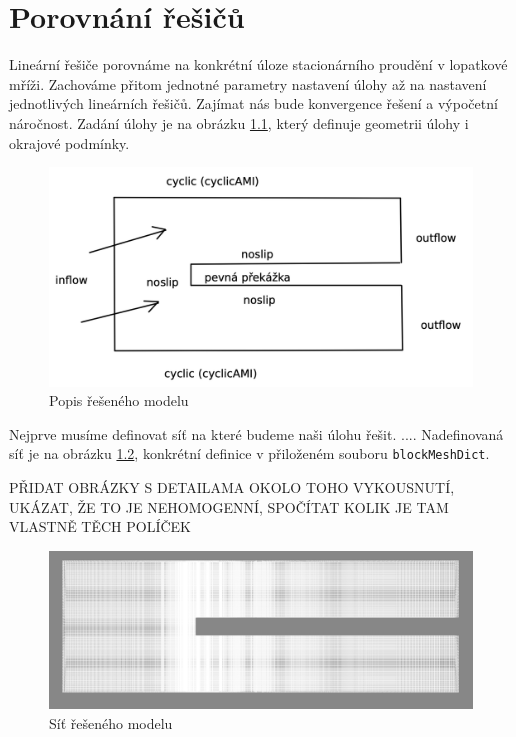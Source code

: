 \documentclass[a4paper,12pt]{report}
\theoremstyle{remark}
\begin{document}
	{\let\clearpage\relax \chapter{Porovnání řešičů}}
	
	Lineární řešiče porovnáme na konkrétní úloze stacionárního proudění v lopatkové mříži. Zachováme přitom jednotné parametry nastavení úlohy až na nastavení jednotlivých lineárních řešičů. Zajímat nás bude konvergence řešení a výpočetní náročnost. Zadání úlohy je na obrázku \ref{fig:zadani}, který definuje geometrii úlohy i okrajové podmínky. 
	
	\begin{figure}[H]
		\centering
		\includegraphics[width=1\linewidth]{zadani.png}
		\caption{Popis řešeného modelu}
		\label{fig:zadani}
	\end{figure}


Nejprve musíme definovat síť na které budeme naši úlohu řešit. .... Nadefinovaná síť je na obrázku \ref{fig:pvmesh}, konkrétní definice v přiloženém souboru \texttt{blockMeshDict}.

PŘIDAT OBRÁZKY S DETAILAMA OKOLO TOHO VYKOUSNUTÍ, UKÁZAT, ŽE TO JE NEHOMOGENNÍ, SPOČÍTAT KOLIK JE TAM VLASTNĚ TĚCH POLÍČEK

\begin{figure}[H]
	\centering
	\includegraphics[width=1\linewidth]{pv-mesh.png}
	\caption{Síť řešeného modelu}
	\label{fig:pvmesh}
\end{figure}
\end{document}
